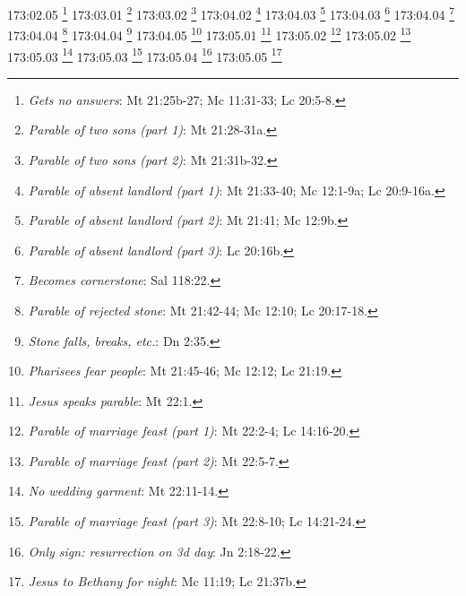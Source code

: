 173:02.05 \footnote{\textit{Gets no answers}: Mt 21:25b-27; Mc 11:31-33; Lc 20:5-8.}
173:03.01 \footnote{\textit{Parable of two sons (part 1)}: Mt 21:28-31a.}
173:03.02 \footnote{\textit{Parable of two sons (part 2)}: Mt 21:31b-32.}
173:04.02 \footnote{\textit{Parable of absent landlord (part 1)}: Mt 21:33-40; Mc 12:1-9a; Lc 20:9-16a.}
173:04.03 \footnote{\textit{Parable of absent landlord (part 2)}: Mt 21:41; Mc 12:9b.}
173:04.03 \footnote{\textit{Parable of absent landlord (part 3)}: Lc 20:16b.}
173:04.04 \footnote{\textit{Becomes cornerstone}: Sal 118:22.}
173:04.04 \footnote{\textit{Parable of rejected stone}: Mt 21:42-44; Mc 12:10; Lc 20:17-18.}
173:04.04 \footnote{\textit{Stone falls, breaks, etc.}: Dn 2:35.}
173:04.05 \footnote{\textit{Pharisees fear people}: Mt 21:45-46; Mc 12:12; Lc 21:19.}
173:05.01 \footnote{\textit{Jesus speaks parable}: Mt 22:1.}
173:05.02 \footnote{\textit{Parable of marriage feast (part 1)}: Mt 22:2-4; Lc 14:16-20.}
173:05.02 \footnote{\textit{Parable of marriage feast (part 2)}: Mt 22:5-7.}
173:05.03 \footnote{\textit{No wedding garment}: Mt 22:11-14.}
173:05.03 \footnote{\textit{Parable of marriage feast (part 3)}: Mt 22:8-10; Lc 14:21-24.}
173:05.04 \footnote{\textit{Only sign: resurrection on 3d day}: Jn 2:18-22.}
173:05.05 \footnote{\textit{Jesus to Bethany for night}: Mc 11:19; Lc 21:37b.}







